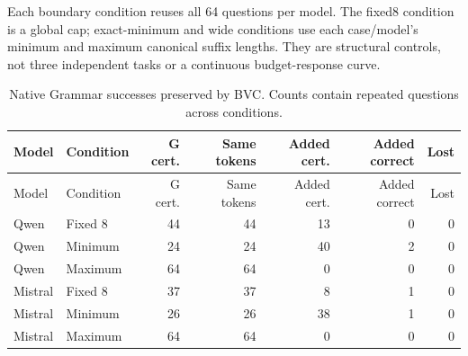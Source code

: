 \documentclass[12pt,a4paper]{article}
\begin{document}
Each boundary condition reuses all 64 questions per model. The fixed8 condition is a global cap; exact-minimum and wide conditions use each case/model's minimum and maximum canonical suffix lengths. They are structural controls, not three independent tasks or a continuous budget-response curve.
\begin{longtable}{@{}llrrrrr@{}}
\caption{Native Grammar successes preserved by BVC. Counts contain repeated questions across conditions.}\label{tab:trajectory}\\
\toprule
Model & Condition & G cert. & Same tokens & Added cert. & Added correct & Lost \\
\midrule
\endfirsthead
\toprule
Model & Condition & G cert. & Same tokens & Added cert. & Added correct & Lost \\
\midrule
\endhead
Qwen & Fixed 8 & 44 & 44 & 13 & 0 & 0 \\
Qwen & Minimum & 24 & 24 & 40 & 2 & 0 \\
Qwen & Maximum & 64 & 64 & 0 & 0 & 0 \\
Mistral & Fixed 8 & 37 & 37 & 8 & 1 & 0 \\
Mistral & Minimum & 26 & 26 & 38 & 1 & 0 \\
Mistral & Maximum & 64 & 64 & 0 & 0 & 0 \\
\bottomrule
\end{longtable}
\end{document}
